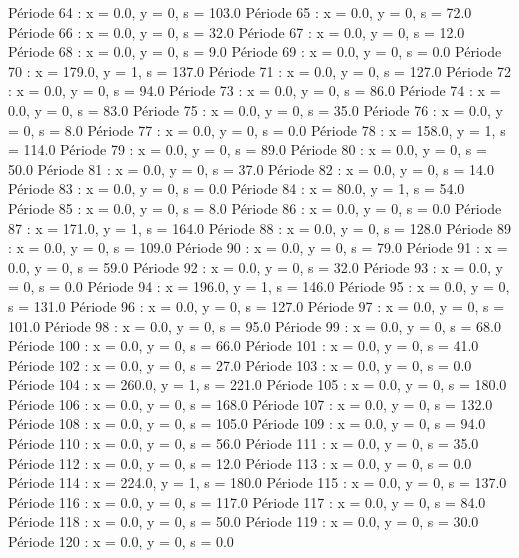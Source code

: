 Période 64 : x = 0.0, y = 0, s = 103.0
Période 65 : x = 0.0, y = 0, s = 72.0
Période 66 : x = 0.0, y = 0, s = 32.0
Période 67 : x = 0.0, y = 0, s = 12.0
Période 68 : x = 0.0, y = 0, s = 9.0
Période 69 : x = 0.0, y = 0, s = 0.0
Période 70 : x = 179.0, y = 1, s = 137.0
Période 71 : x = 0.0, y = 0, s = 127.0
Période 72 : x = 0.0, y = 0, s = 94.0
Période 73 : x = 0.0, y = 0, s = 86.0
Période 74 : x = 0.0, y = 0, s = 83.0
Période 75 : x = 0.0, y = 0, s = 35.0
Période 76 : x = 0.0, y = 0, s = 8.0
Période 77 : x = 0.0, y = 0, s = 0.0
Période 78 : x = 158.0, y = 1, s = 114.0
Période 79 : x = 0.0, y = 0, s = 89.0
Période 80 : x = 0.0, y = 0, s = 50.0
Période 81 : x = 0.0, y = 0, s = 37.0
Période 82 : x = 0.0, y = 0, s = 14.0
Période 83 : x = 0.0, y = 0, s = 0.0
Période 84 : x = 80.0, y = 1, s = 54.0
Période 85 : x = 0.0, y = 0, s = 8.0
Période 86 : x = 0.0, y = 0, s = 0.0
Période 87 : x = 171.0, y = 1, s = 164.0
Période 88 : x = 0.0, y = 0, s = 128.0
Période 89 : x = 0.0, y = 0, s = 109.0
Période 90 : x = 0.0, y = 0, s = 79.0
Période 91 : x = 0.0, y = 0, s = 59.0
Période 92 : x = 0.0, y = 0, s = 32.0
Période 93 : x = 0.0, y = 0, s = 0.0
Période 94 : x = 196.0, y = 1, s = 146.0
Période 95 : x = 0.0, y = 0, s = 131.0
Période 96 : x = 0.0, y = 0, s = 127.0
Période 97 : x = 0.0, y = 0, s = 101.0
Période 98 : x = 0.0, y = 0, s = 95.0
Période 99 : x = 0.0, y = 0, s = 68.0
Période 100 : x = 0.0, y = 0, s = 66.0
Période 101 : x = 0.0, y = 0, s = 41.0
Période 102 : x = 0.0, y = 0, s = 27.0
Période 103 : x = 0.0, y = 0, s = 0.0
Période 104 : x = 260.0, y = 1, s = 221.0
Période 105 : x = 0.0, y = 0, s = 180.0
Période 106 : x = 0.0, y = 0, s = 168.0
Période 107 : x = 0.0, y = 0, s = 132.0
Période 108 : x = 0.0, y = 0, s = 105.0
Période 109 : x = 0.0, y = 0, s = 94.0
Période 110 : x = 0.0, y = 0, s = 56.0
Période 111 : x = 0.0, y = 0, s = 35.0
Période 112 : x = 0.0, y = 0, s = 12.0
Période 113 : x = 0.0, y = 0, s = 0.0
Période 114 : x = 224.0, y = 1, s = 180.0
Période 115 : x = 0.0, y = 0, s = 137.0
Période 116 : x = 0.0, y = 0, s = 117.0
Période 117 : x = 0.0, y = 0, s = 84.0
Période 118 : x = 0.0, y = 0, s = 50.0
Période 119 : x = 0.0, y = 0, s = 30.0
Période 120 : x = 0.0, y = 0, s = 0.0


